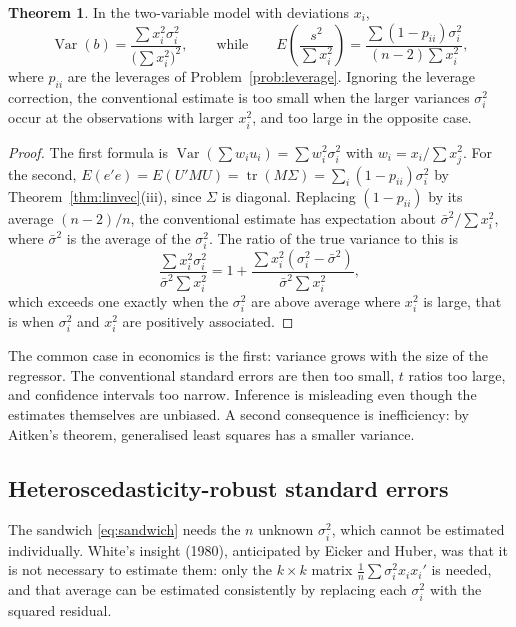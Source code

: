 \documentclass[11pt,a4paper]{article}
\numberwithin{equation}{section}
\DeclareMathOperator{\Var}{Var}
\DeclareMathOperator{\tr}{tr}
\theoremstyle{definition}
\newtheorem{thm}{Theorem}[subsection]
\begin{document}
\begin{thm}
\label{thm:hetbias}
In the two-variable model with deviations $x_i$,
\[
\Var(b) = \frac{\sum x_i^2\sigma_i^2}{\bigl(\sum x_i^2\bigr)^2}, \qquad\text{while}\qquad E\!\left(\frac{s^2}{\sum x_i^2}\right) = \frac{\sum (1 - p_{ii})\sigma_i^2}{(n - 2)\sum x_i^2} ,
\]
where $p_{ii}$ are the leverages of Problem~\ref{prob:leverage}. Ignoring the leverage correction, the conventional estimate is too small when the larger
variances $\sigma_i^2$ occur at the observations with larger $x_i^2$, and too large in the opposite case.
\end{thm}

\begin{proof}
The first formula is $\Var(\sum w_iu_i) = \sum w_i^2\sigma_i^2$ with $w_i = x_i/\sum x_j^2$. For the second, $E(e'e) = E(U'MU) = \tr(M\Sigma) = \sum_i (1 - p_{ii})\sigma_i^2$ by
Theorem~\ref{thm:linvec}(iii), since $\Sigma$ is diagonal. Replacing $(1 - p_{ii})$ by its average $(n - 2)/n$, the conventional estimate has expectation about
$\bar\sigma^2/\sum x_i^2$, where $\bar\sigma^2$ is the average of the $\sigma_i^2$. The ratio of the true variance to this is
\[
\frac{\sum x_i^2\sigma_i^2}{\bar\sigma^2\sum x_i^2} = 1 + \frac{\sum x_i^2(\sigma_i^2 - \bar\sigma^2)}{\bar\sigma^2\sum x_i^2},
\]
which exceeds one exactly when the $\sigma_i^2$ are above average where $x_i^2$ is large, that is when $\sigma_i^2$ and $x_i^2$ are positively associated.
\end{proof}

The common case in economics is the first: variance grows with the size of the regressor. The conventional standard errors are then too
small, $t$ ratios too large, and confidence intervals too narrow. Inference is misleading even though the estimates themselves are unbiased. A
second consequence is inefficiency: by Aitken's theorem, generalised least squares has a smaller variance.

\subsection{Heteroscedasticity-robust standard errors}
\label{ssec:robust}

The sandwich \eqref{eq:sandwich} needs the $n$ unknown $\sigma_i^2$, which cannot be estimated individually. White's insight (1980), anticipated by Eicker
and Huber, was that it is not necessary to estimate them: only the $k \times k$ matrix $\frac1n\sum\sigma_i^2x_ix_i'$ is needed, and that average can be
estimated consistently by replacing each $\sigma_i^2$ with the squared residual.
\end{document}
